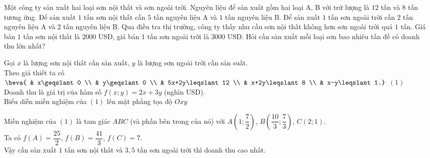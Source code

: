 \begin{bt}%
Một công ty sản xuất hai loại sơn nội thất và sơn ngoài trời. Nguyên liệu để sản xuất gồm hai loại A, B với trữ lượng là $12$ tấn và $8$ tấn tương ứng. Để sản xuất $1$ tấn sơn nội thất cần $5$ tấn nguyên liệu A và $1$ tấn nguyên liệu B. Để sản xuất $1$ tấn sơn ngoài trời cần $2$ tấn nguyên liệu A và $2$ tấn nguyên liệu B. Qua điều tra thị trường, công ty thấy nhu cầu sơn nội thất không hơn sơn ngoài trời quá $1$ tấn. Giá bán $1$ tấn sơn nội thất là $2000$ USD, giá bán $1$ tấn sơn ngoài trời là $3000$ USD. Hỏi cần sản xuất mỗi loại sơn bao nhiêu tấn đề có doanh thu lớn nhất?
\loigiai
{
Gọi $x$ là lượng sơn nội thất cần sản xuất, $y$ là lượng sơn ngoài trời cần sản suất. \\
Theo giả thiết ta có $\heva{ & x\geqslant0 \\ & y\geqslant0 \\ & 5x+2y\leqslant12 \\ & x+2y\leqslant8 \\ & x-y\leqslant1.}$ \hfill $(1)$ \\
Doanh thu là giá trị của hàm số $f(x;y)=2x+3y$ (nghìn USD). \\
Biểu diễn miền nghiệm của $(1)$ lên mặt phẳng tọa độ $Oxy$
\begin{center}
\end{center}
Miền nghiệm của $(1)$ là tam giác $ABC$ (và phần bên trong của nó) với $A\left(1;\dfrac{7}{2}\right)$, $B\left(\dfrac{10}{3};\dfrac{7}{3}\right)$, $C(2;1)$. \\
Ta có $f(A)=\dfrac{25}{2}$, $f(B)=\dfrac{41}{3}$, $f(C)=7$. \\
Vậy cần sản xuất $1$ tấn sơn nội thất và $3{,5}$ tấn sơn ngoài trời thì doanh thu cao nhất.
}
\end{bt}

